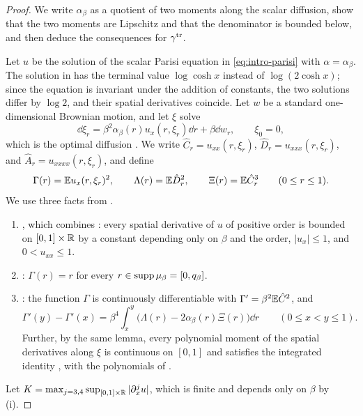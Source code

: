 \begin{proof}
We write $\alpha_\beta$ as a quotient of two moments along the scalar
diffusion, show that the two moments are Lipschitz and that the denominator is
bounded below, and then deduce the consequences for $\gamma^{\rm tr}$.

Let $u$ be the solution of the scalar Parisi equation in \eqref{eq:intro-parisi}
with $\alpha=\alpha_\beta$. The solution in \cite{Lopatto} has the terminal
value $\log\cosh x$ instead of $\log(2\cosh x)$; since the equation is
invariant under the addition of constants, the two solutions differ by
$\log2$, and their spatial derivatives coincide. Let $w$ be a standard
one-dimensional Brownian motion, and let $\xi$ solve
\[
 \dd\xi_r=\beta^2\alpha_\beta(r)u_x(r,\xi_r)\dd r+\beta\dd w_r,
 \qquad\xi_0=0,
\]
which is the optimal diffusion \cite[(2.4)]{Lopatto}. We write
$\hat C_r=u_{xx}(r,\xi_r)$, $\hat D_r=u_{xxx}(r,\xi_r)$, and
$\hat A_r=u_{xxxx}(r,\xi_r)$, and define
\[
 \Gamma(r)=\mathbb E u_x(r,\xi_r)^2,\qquad \Lambda(r)=\mathbb E\hat D_r^2,\qquad
 \Xi(r)=\mathbb E\hat C_r^3 \qquad(0\le r\le1).
\]
We use three facts from \cite[Section~2]{Lopatto}.
\begin{enumerate}
\item[(i)] \cite[Proposition~2.1]{Lopatto}, which combines
\cite[Propositions~1, 2, and~5]{AuffingerChen2015Properties}: every spatial
derivative of $u$ of positive order is bounded on $[0,1]\times\mathbb R$ by a
constant depending only on $\beta$ and the order, $|u_x|\le1$, and
$0<u_{xx}\le1$.
\item[(ii)] \cite[Lemma~2.6, (2.19)]{Lopatto}: $\Gamma(r)=r$ for every
$r\in\operatorname{supp}\mu_\beta=[0,q_\beta]$.
\item[(iii)] \cite[Lemma~2.5, (2.13) and (2.14)]{Lopatto}: the function
$\Gamma$ is continuously differentiable with $\Gamma'=\beta^2\mathbb E\hat C^2$, and
\[
 \Gamma'(y)-\Gamma'(x)=\beta^4\int_x^y
 \bigl(\Lambda(r)-2\alpha_\beta(r)\Xi(r)\bigr)\dd r
 \qquad(0\le x<y\le1).
\]
Further, by the same lemma, every polynomial moment of the spatial derivatives
along $\xi$ is continuous on $[0,1]$ and satisfies the integrated identity
\cite[(2.16)]{Lopatto}, with the polynomials of \cite[(2.18)]{Lopatto}.
\end{enumerate}
Let $K=\max_{j=3,4}\sup_{[0,1]\times\mathbb R}|\partial_x^ju|$, which is finite and
depends only on $\beta$ by (i).


\end{proof}
